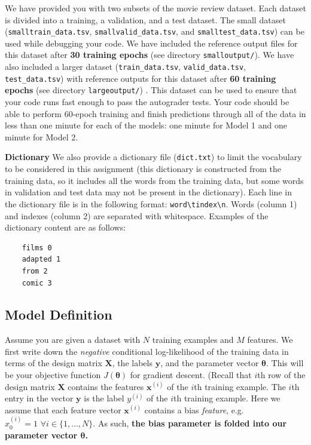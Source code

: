 \documentclass[11pt]{exam}
\numberwithin{equation}{section} %
\numberwithin{figure}{section} %
\numberwithin{table}{section} %
\newcommand{\xv}{\mathbf{x}}
\newcommand{\yv}{\mathbf{y}}
\newcommand{\Xv}{\mathbf{X}}
\newcommand{\thetav     }{\boldsymbol \theta     }
\begin{document}
We have provided you with two subsets of the movie review dataset. Each dataset is divided into a training, a validation, and a test dataset.
%
%
The small dataset (\lstinline{smalltrain_data.tsv}, \lstinline{smallvalid_data.tsv}, and \lstinline{smalltest_data.tsv}) can be used while debugging your code. We have included the reference output files for this dataset after \textbf{30 training epochs} (see directory \lstinline{smalloutput/}). 
%
We have also included a larger dataset (\lstinline{train_data.tsv}, \lstinline{valid_data.tsv}, \lstinline{test_data.tsv}) with reference outputs for this dataset after \textbf{60 training epochs}  (see directory \lstinline{largeoutput/}) . This dataset can be used to ensure that your code runs fast enough to pass the autograder tests. Your code should be able to perform 60-epoch training and finish  predictions through all of the data in less than one minute for each of the models: one minute for Model 1 and one minute for Model 2.

  {\bf Dictionary } We also provide a dictionary file (\lstinline{dict.txt}) to limit the vocabulary to be considered in this assignment (this dictionary is constructed from the training data, so it includes all the words from the training data, but some words in validation and test data may not be present in the dictionary). Each line in the dictionary file is in the following format: \lstinline{word\tindex\n}. Words (column 1) and indexes (column 2) are separated with whitespace. Examples of the dictionary content are as follows: 
    \begin{lstlisting}
    films 0
    adapted 1
    from 2
    comic 3
    \end{lstlisting}
 
\subsection{Model Definition}\label{modeldescript}
 
 Assume you are given a dataset with $N$ training examples and $M$ features. We first write down the \emph{negative} conditional log-likelihood of the training data in terms of the design matrix $\Xv$, the labels $\yv$, and the parameter vector $\thetav$. This will be your objective function $J(\thetav)$ for gradient descent. 
%
(Recall that $i$th row of the design matrix $\Xv$ contains the features $\xv^{(i)}$ of the $i$th training example. The $i$th entry in the vector $\yv$ is the label $y^{(i)}$ of the $i$th training example.  Here we assume that each feature vector $\xv^{(i)}$ contains a bias \emph{feature}, e.g. $x_0^{(i)} = 1 \,\,\forall i \in \{1,\ldots,N\}$. As such, \textbf{the bias parameter is folded into our parameter vector $\thetav$.}
\end{document}
